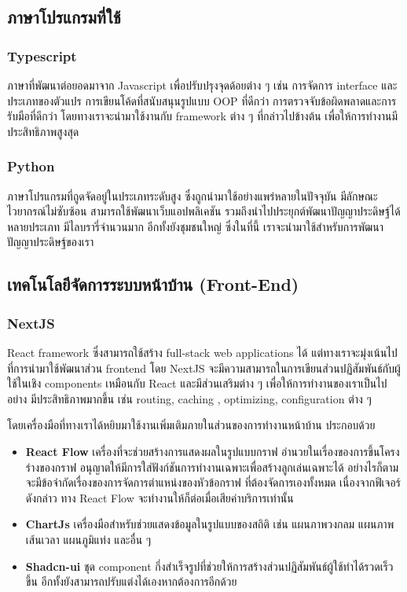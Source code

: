 \subsection{ภาษาโปรแกรมที่ใช้}
\subsubsection{Typescript}
ภาษาที่พัฒนาต่อยอดมาจาก Javascript เพื่อปรับปรุงจุดด้อยต่าง ๆ เช่น การจัดการ
interface และประเภทของตัวแปร การเขียนโค้ดที่สนับสนุนรูปแบบ OOP ที่ดีกว่า
การตรวจจับข้อผิดพลาดและการรับมือที่ดีกว่า โดยทางเราจะนำมาใช้งานกับ framework
ต่าง ๆ ที่กล่าวไปข้างต้น เพื่อให้การทำงานมีประสิทธิภาพสูงสุด
\subsubsection{Python}
ภาษาโปรแกรมที่ถูดจัดอยู่ในประเภทระดับสูง ซึ่งถูกนำมาใช้อย่างแพร่หลายในปัจจุบัน
มีลักษณะไวยากรณ์ไม่ซับซ้อน สามารถใช้พัฒนาเว็บแอปพลิเคชัน
รวมถึงนำไปประยุกต์พัฒนาปัญญาประดิษฐ์ได้หลายประเภท
มีไลบรารี่จำนวนมาก อีกทั้งยังชุมชนใหญ่ ซึ่งในที่นี้ เราจะนำมาใช้สำหรับการพัฒนาปัญญาประดิษฐ์ของเรา
\subsection{เทคโนโลยีจัดการระบบหน้าบ้าน (Front-End)}
\subsubsection{NextJS}
React framework ซึ่งสามารถใช้สร้าง full-stack web applications ได้
แต่ทางเราจะมุ่งเน้นไปที่การนำมาใช้พัฒนาส่วน frontend โดย NextJS
จะมีความสามารถในการเขียนส่วนปฏิสัมพันธ์กับผู้ใช้ในเชิง components
เหมือนกับ React และมีส่วนเสริมต่าง ๆ เพื่อให้การทำงานของเราเป็นไปอย่าง
มีประสิทธิภาพมากขึ้น เช่น routing, caching , optimizing, configuration
ต่าง ๆ

โดยเครื่องมือที่ทางเราได้หยิบมาใช้งานเพิ่มเติมภายในส่วนของการทำงานหน้าบ้าน ประกอบด้วย
\begin{itemize}
      \item \textbf{React Flow}\label{subsec:reactflow} เครื่องที่จะช่วยสร้างการแสดงผลในรูปแบบกราฟ อำนวยในเรื่องของการขึ้นโครงร่างของกราฟ อนุญาตให้มีการใส่ฟังก์ชันการทำงานเฉพาะเพื่อสร้างลูกเล่นเฉพาะได้ อย่างไรก็ตาม จะมีข้อจำกัดเรื่องของการจัดการตำแหน่งของหัวข้อกราฟ ที่ต้องจัดการเองทั้งหมด เนื่องจากฟีเจอร์ดังกล่าว ทาง React Flow จะทำงานให้ก็ต่อเมื่อเสียค่าบริการเท่านั้น
      \item \textbf{ChartJs} เครื่องมือสำหรับช่วยแสดงข้อมูลในรูปแบบของสถิติ เช่น แผนภาพวงกลม แผนภาพเส้นเวลา แผนภูมิแท่ง และอื่น ๆ
      \item \textbf{Shadcn-ui} ชุด component กึ่งสำเร็จรูปที่ช่วยให้การสร้างส่วนปฏิสัมพันธ์ผู้ใช้ทำได้รวดเร็วขึ้น อีกทั้งยังสามารถปรับแต่งได้เองหากต้องการอีกด้วย
\end{itemize}

